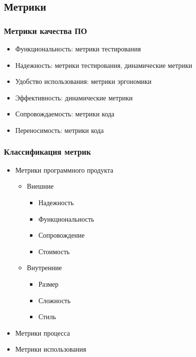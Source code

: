\documentclass{../../slides-style}
\begin{document}
    \subsection{Метрики}

    \begin{frame}
        \frametitle{Метрики качества ПО}
        \begin{itemize}
            \item Функциональность: метрики тестирования
            \item Надежность: метрики тестирования, динамические метрики
            \item Удобство использования: метрики эргономики
            \item Эффективность: динамические метрики
            \item Сопровождаемость: метрики кода
            \item Переносимость: метрики кода
        \end{itemize}
    \end{frame}

    \begin{frame}
        \frametitle{Классификация метрик}
        \begin{itemize}
            \item Метрики программного продукта
            \begin{itemize}
                \item Внешние
                \begin{itemize}
                    \item Надежность
                    \item Функциональность
                    \item Сопровождение
                    \item Стоимость
                \end{itemize}
                \item Внутренние
                \begin{itemize}
                    \item Размер
                    \item Сложность
                    \item Стиль
                \end{itemize}
            \end{itemize}
            \item Метрики процесса
            \item Метрики использования
        \end{itemize}
    \end{frame}
\end{document}

